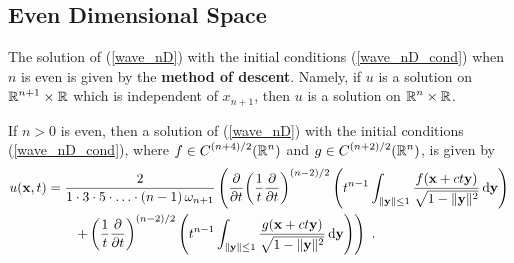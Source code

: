 \subsection{Even Dimensional Space}

The solution of (\ref{wave_nD}) with the initial conditions
(\ref{wave_nD_cond}) when $n$ is even is given by the
{\bfseries method of descent}.
Namely, if $u$ is a solution on
$\displaystyle \RR^{n+1}\times \RR$ which is independent of
$x_{n+1}$, then $u$ is a solution on $\displaystyle \RR^n\times \RR$.

\begin{theorem} \label{wave_sol_nD_even}
If $n >0$ is even, then a solution of
(\ref{wave_nD}) with the initial conditions (\ref{wave_nD_cond}), where
$\displaystyle f\in C^{(n+4)/2}(\RR^n)$ and
$\displaystyle g\in C^{(n+2)/2}(\RR^n)$, is given by
\begin{align}
u(\VEC{x},t) &= \frac{2}{1\cdot 3 \cdot 5 \cdot \ldots \cdot (n-1)
\,\omega_{n+1}}
\left( \pdfdx{ \left( \frac{1}{t} \pdydx{}{t} \right)^{(n-2)/2} }{t}
\left( t^{n-1} \int_{\|\VEC{y}\|\leq 1}
\frac{f(\VEC{x} + ct \VEC{y})}{\sqrt{1-\|\VEC{y}\|^2}} \dx{\VEC{y}}
\right)  \right. \nonumber \\
&\qquad \left. + \left( \frac{1}{t} \pdydx{}{t} \right)^{(n-2)/2}
\left( t^{n-1} \int_{\|\VEC{y}\|\leq 1}
\frac{g(\VEC{x}+ ct\VEC{y})}{\sqrt{1-\|\VEC{y}\|^2}} \dx{\VEC{y}}
\right) \right) \ .  \label{wave_sol_nD_evenEQ}
\end{align}
\end{theorem}

